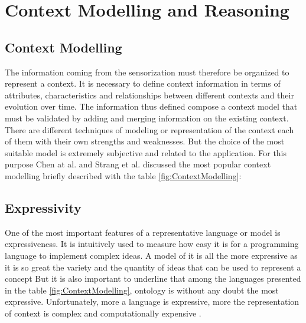 \documentclass{thesisreport}
\begin{document}
\section{Context Modelling and Reasoning}
\subsection{Context Modelling}

The information coming from the sensorization must therefore be organized to represent a context. 
It is necessary to define context information in terms of attributes, characteristics and relationships between different contexts and their evolution over time. The information thus defined compose a context model that must be validated by adding and merging information on the existing context.
There are different techniques of modeling or representation of the context each of them with their own strengths and weaknesses. But the choice of the most suitable model is extremely subjective and related to the application. For this purpose Chen at al. \cite{chen2000survey} and Strang et al. \cite{strang2004context} discussed the most popular context modelling briefly described with the table  \ref{fig:ContextModelling}:
\vspace{0.2 cm}
	


\subsection{Expressivity}

One of the most important features of a representative language or model is expressiveness. It is intuitively used to measure how easy it is for a programming language to implement complex ideas. A model of it is all the more expressive as it is so great the variety and the quantity of ideas that can be used to represent a concept
But it is also important to underline that among the languages presented in the table \ref{fig:ContextModelling}, ontology is without any doubt the most expressive. Unfortunately, more a language is expressive, more the representation of context is complex and computationally expensive \cite{farmer2007chiron}.
\end{document}
